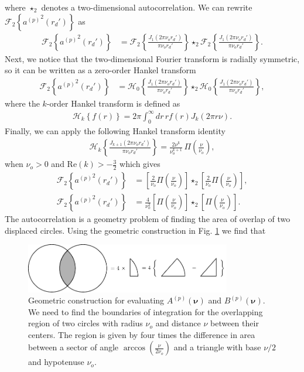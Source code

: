 \documentclass[11pt]{article}
\providecommand{\bs}[1]{\boldsymbol{#1}}
\begin{document}
where $\star_2$ denotes a two-dimensional autocorrelation. We can rewrite
$\mathcal{F}_2\left\{{a^{(p)}}^2(r_d')\right\}$ as
\begin{align}
  \mathcal{F}_2\left\{{a^{(p)}}^2(r_d')\right\} &= \mathcal{F}_2\left\{\frac{J_1(2\pi\nu_o r_d')}{\pi\nu_o r_d'}\right\} \star_2 \mathcal{F}_2\left\{\frac{J_1(2\pi\nu_o r_d')}{\pi\nu_o r_d'}\right\}.
\end{align}
Next, we notice that the two-dimensional Fourier transform is radially
symmetric, so it can be written as a zero-order Hankel transform
\begin{align}
\mathcal{F}_2\left\{{a^{(p)}}^2(r_d')\right\} &= \mathcal{H}_0\left\{\frac{J_1(2\pi\nu_o r_d')}{\pi\nu_o r_d'}\right\} \star_2 \mathcal{H}_0\left\{\frac{J_1(2\pi\nu_o r_d')}{\pi\nu_o r_d'}\right\}, 
\end{align}
where the $k$-order Hankel transform is defined as
\begin{align}
  \mathcal{H}_k\left\{f(r)\right\} = 2\pi \int_0^\infty dr\, r f(r)J_k(2\pi r\nu).
\end{align}
Finally, we can apply the following Hankel transform identity
\begin{align}
  \mathcal{H}_{k}\left\{\frac{J_{k+1}(2\pi \nu_or_d')}{\pi\nu_o r_d'}\right\} =
  \frac{2\nu^k}{\nu_o^{k+1}}\, \Pi\left(\frac{\nu}{\nu_o}\right)\label{eq:hankstar2},
\end{align}
when $\nu_o > 0$ and $\text{Re}(k) > -\frac{3}{2}$ \cite{poul1998} which gives
\begin{align}
  \mathcal{F}_2\left\{{a^{(p)}}^2(r_d')\right\} &= \left[\frac{2}{\nu_o}\Pi\left(\frac{\nu}{\nu_o}\right)\right] \star_2 \left[\frac{2}{\nu_o}\Pi\left(\frac{\nu}{\nu_o}\right)\right],\\
  \mathcal{F}_2\left\{{a^{(p)}}^2(r_d')\right\} &= \frac{4}{\nu_o^2}\left[\Pi\left(\frac{\nu}{\nu_o}\right)\right] \star_2 \left[\Pi\left(\frac{\nu}{\nu_o}\right)\right].
\end{align}
The autocorrelation is a geometry problem of finding the area of overlap of two
displaced circles. Using the geometric construction in Fig. \ref{fig:geometry} we find that
\begin{figure}[h]
 \captionsetup{width=1.0\linewidth}
 \centering
   \centering
   \includegraphics[width = 0.8\textwidth]{../figures/geometry/geometry.pdf}
   \caption{Geometric construction for evaluating $A^{(p)}(\bs{\nu})$ and
     $B^{(p)}(\bs{\nu})$. We need to find the boundaries of integration for the
     overlapping region of two circles with radius $\nu_o$ and distance $\nu$
     between their centers. The region is given by four times the difference in
     area between a sector of angle $\arccos\left(\frac{\nu}{2\nu_o}\right)$ and
     a triangle with base $\nu/2$ and hypotenuse $\nu_o$.}
   \label{fig:geometry}
\end{figure}
\end{document}
